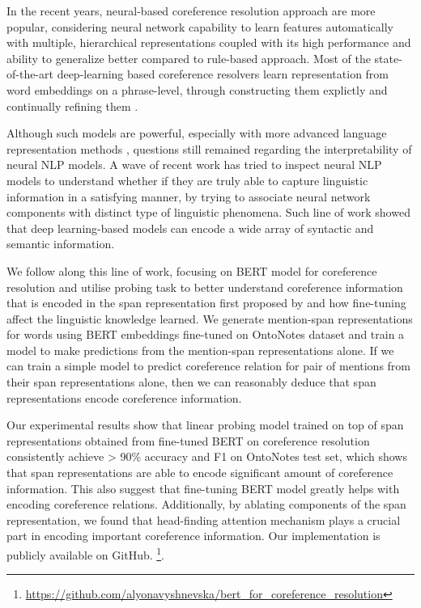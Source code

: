 \documentclass[11pt]{article}
\begin{document}
In the recent years, neural-based coreference resolution approach are more popular, considering neural network capability to learn features automatically with multiple, hierarchical representations coupled with its high performance and ability to generalize better compared to rule-based approach. Most of the state-of-the-art deep-learning based coreference resolvers learn representation from word embeddings on a phrase-level, through constructing them explictly \parencite{lee2017end} and continually refining them \parencite{lee2018higher,kantor-globerson-2019-coreference}.

Although such models are powerful, especially with more advanced language representation methods \parencite{devlin2019bert,peters2018elmo}, questions still remained regarding the interpretability of neural NLP models. A wave of recent work has tried to inspect neural NLP models to understand whether if they are truly able to capture linguistic information in a satisfying manner, by trying to associate neural network components with distinct type of linguistic phenomena. Such line of work \parencite{shi2016string,liu2019linguistic,tenney2019context} showed that deep learning-based models can encode a wide array of syntactic and semantic information. 

We follow along this line of work, focusing on BERT model for coreference resolution \parencite{joshi2019coref} and utilise probing task \parencite{tenney2019context,liu2019linguistic} to better understand coreference information that is encoded in the span representation first proposed by \parencite{lee2017end} and how fine-tuning affect the linguistic knowledge learned. We generate mention-span representations for words using BERT embeddings fine-tuned on OntoNotes dataset \parencite{conll} and train a model to make predictions from the mention-span representations alone. If we can train a simple model to predict coreference relation for pair of mentions from their span representations alone, then we can reasonably deduce that span representations encode coreference information.

Our experimental results show that linear probing model trained on top of span representations obtained from fine-tuned BERT on coreference resolution consistently achieve > 90\% accuracy and F1 on OntoNotes test set, which shows that span representations are able to encode significant amount of coreference information. This also suggest that fine-tuning BERT model greatly helps with encoding coreference relations. Additionally, by ablating components of the span representation, we found that head-finding attention mechanism plays a crucial part in encoding important coreference information. Our implementation is publicly available on GitHub.  \footnote{\url{https://github.com/alyonavyshnevska/bert_for_coreference_resolution}}.
\end{document}

